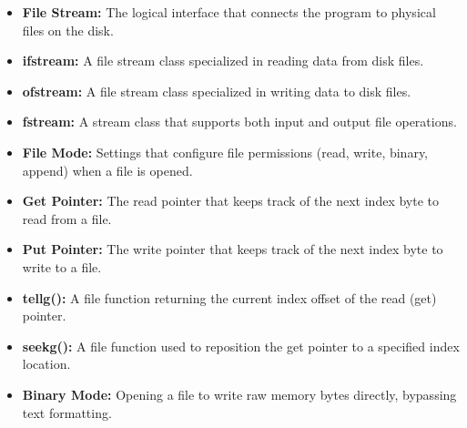 \documentclass[12pt,a4paper]{article}
\begin{document}
\begin{tcolorbox}[defbox, title={\textbf{One-Line Definitions}}]
\begin{itemize}[leftmargin=*, itemsep=2.5pt, topsep=0pt]
  \item \textbf{File Stream:} The logical interface that connects the program to physical files on the disk.
  \item \textbf{ifstream:} A file stream class specialized in reading data from disk files.
  \item \textbf{ofstream:} A file stream class specialized in writing data to disk files.
  \item \textbf{fstream:} A stream class that supports both input and output file operations.
  \item \textbf{File Mode:} Settings that configure file permissions (read, write, binary, append) when a file is opened.
  \item \textbf{Get Pointer:} The read pointer that keeps track of the next index byte to read from a file.
  \item \textbf{Put Pointer:} The write pointer that keeps track of the next index byte to write to a file.
  \item \textbf{tellg():} A file function returning the current index offset of the read (get) pointer.
  \item \textbf{seekg():} A file function used to reposition the get pointer to a specified index location.
  \item \textbf{Binary Mode:} Opening a file to write raw memory bytes directly, bypassing text formatting.
\end{itemize}
\end{tcolorbox}
\end{document}
